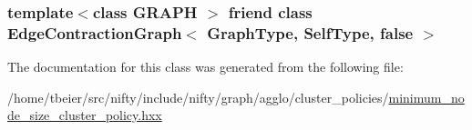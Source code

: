 \subsubsection[{Edge\+Contraction\+Graph$<$ Graph\+Type, Self\+Type, false $>$}]{\setlength{\rightskip}{0pt plus 5cm}template$<$class G\+R\+A\+P\+H $>$ friend class {\bf Edge\+Contraction\+Graph}$<$ {\bf Graph\+Type}, {\bf Self\+Type}, false $>$\hspace{0.3cm}{\ttfamily [friend]}}\label{classnifty_1_1graph_1_1agglo_1_1MinimumNodeSizeClusterPolicy_aca0e7e94ea239b3e26ea0173e356de7a}


The documentation for this class was generated from the following file\+:\begin{DoxyCompactItemize}
\item 
/home/tbeier/src/nifty/include/nifty/graph/agglo/cluster\+\_\+policies/\hyperlink{minimum__node__size__cluster__policy_8hxx}{minimum\+\_\+node\+\_\+size\+\_\+cluster\+\_\+policy.\+hxx}\end{DoxyCompactItemize}
